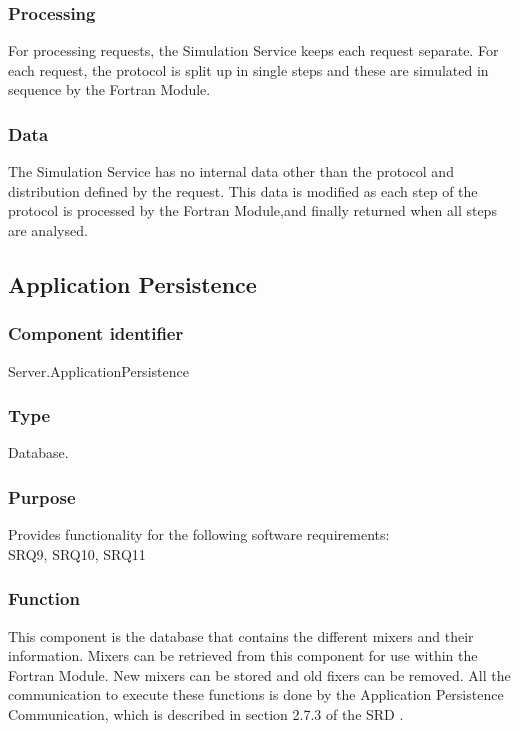 \subsubsection*{Processing}
For processing requests, the Simulation Service keeps each request separate. For each request, the protocol is split up in single steps and these are simulated in sequence by the Fortran Module.

\subsubsection*{Data}
The Simulation Service has no internal data other than the protocol and distribution defined by the request. This data is modified as each step of the protocol is processed by the Fortran Module,and finally returned when all steps are analysed.

\subsection{Application Persistence}

\subsubsection*{Component identifier}
Server.ApplicationPersistence

\subsubsection*{Type}
Database.

\subsubsection*{Purpose}
Provides functionality for the following software requirements:\\
SRQ9, SRQ10, SRQ11

\subsubsection*{Function}
This component is the database that contains the different mixers and their information. Mixers can be retrieved from this component for use within the Fortran Module. New mixers can be stored and old fixers can be removed. All the communication to execute these functions is done by the Application Persistence Communication, which is described in section 2.7.3 of the SRD \cite{srd}.

